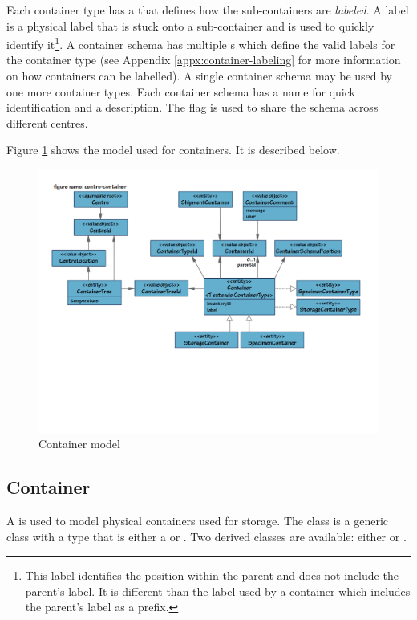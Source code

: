 Each container type has a  that defines how the
sub-containers are \emph{labeled}. A label is a physical label that is stuck
onto a sub-container and is used to quickly identify it\footnote{This label
  identifies the position within the parent and does not include the parent's
  label. It is different than the label used by a container which includes the
  parent's label as a prefix.}. A container schema has multiple
s which define the valid labels for the
container type (see Appendix \ref{appx:container-labeling} for more information
on how containers can be labelled). A single container schema may be used by
one more container types. Each container schema has a name for quick
identification and a description. The  flag is used to share
the schema across different centres.

Figure \ref{fig:centre-container} shows the model used for containers. It is
described below.

\begin{figure}[H]
  \centering
  \includegraphics[trim={10mm 68mm 14mm 18mm}, clip,
    width=1\textwidth]{images/centre-container}
  \caption{Container model}
  \label{fig:centre-container}
\end{figure}

\subsection*{Container}
A  is used to model physical containers used for
storage. The  class is a generic class with a type that
is either a  or
. Two derived classes are available: either
 or .

